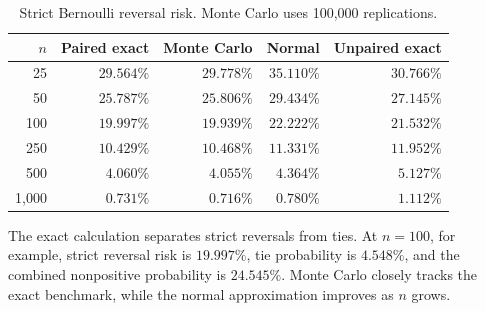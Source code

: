 \begin{table}[H]
\centering
\caption{Strict Bernoulli reversal risk. Monte Carlo uses 100,000 replications.}
\begin{tabular}{rrrrr}
\toprule
$n$ & Paired exact & Monte Carlo & Normal & Unpaired exact \\
\midrule
25    & $29.564\%$ & $29.778\%$ & $35.110\%$ & $30.766\%$ \\
50    & $25.787\%$ & $25.806\%$ & $29.434\%$ & $27.145\%$ \\
100   & $19.997\%$ & $19.939\%$ & $22.222\%$ & $21.532\%$ \\
250   & $10.429\%$ & $10.468\%$ & $11.331\%$ & $11.952\%$ \\
500   & $ 4.060\%$ & $ 4.055\%$ & $ 4.364\%$ & $ 5.127\%$ \\
1,000 & $ 0.731\%$ & $ 0.716\%$ & $ 0.780\%$ & $ 1.112\%$ \\
\bottomrule
\end{tabular}
\end{table}

The exact calculation separates strict reversals from ties. At $n=100$, for
example, strict reversal risk is $19.997\%$, tie probability is $4.548\%$, and
the combined nonpositive probability is $24.545\%$. Monte Carlo closely tracks
the exact benchmark, while the normal approximation improves as $n$ grows.

